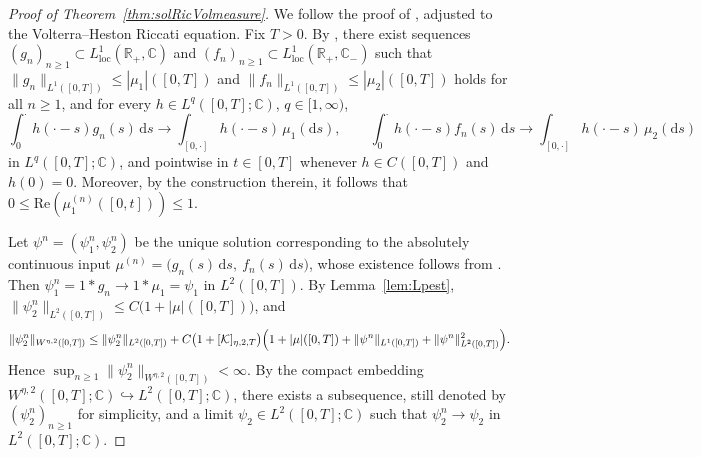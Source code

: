 \documentclass[10pt,a4paper,reqno]{amsart}
\theoremstyle{plain}
\theoremstyle{definition}
\theoremstyle{remark}
\theoremstyle{example}
\begin{document}
\begin{proof}[Proof of Theorem~\ref{thm:solRicVolmeasure}]
     We follow the proof of \cite[Thm. 3.10]{friesen2024volterra}, adjusted to the Volterra--Heston Riccati equation. Fix $T>0$. By \cite[Lem. 3.8]{friesen2024volterra}, there exist sequences $(g_n)_{n\ge1}\subset L^1_{\mathrm{loc}}(\mathbb{R}_+,\mathbb{C})$ and $(f_n)_{n\ge1}\subset L^1_{\mathrm{loc}}(\mathbb{R}_+,\mathbb{C}_-)$ such that $\|g_n\|_{L^1([0,T])}\le |\mu_1|([0,T])$ and $\|f_n\|_{L^1([0,T])}\le |\mu_2|([0,T])$ holds for all $n \geq 1$, and for every $h\in L^q([0,T];\mathbb{C})$, $q\in[1,\infty)$,
     $$
        \int_0^\cdot h(\cdot-s)g_n(s)\,\mathrm{d}s \longrightarrow \int_{[0,\cdot]} h(\cdot-s)\,\mu_1(\mathrm{d}s),
        \qquad
        \int_0^\cdot h(\cdot-s)f_n(s)\,\mathrm{d}s \longrightarrow \int_{[0,\cdot]} h(\cdot-s)\,\mu_2(\mathrm{d}s)
     $$
     in $L^q([0,T];\mathbb{C})$, and pointwise in $t\in[0,T]$ whenever $h\in C([0,T])$ and $h(0)=0$. Moreover, by the construction therein, it follows that $0 \leq \mathrm{Re}(\mu_1^{(n)}([0,t])) \leq 1$. 

     Let $\psi^n=(\psi_1^n,\psi_2^n)$ be the unique solution corresponding to the absolutely continuous input $\mu^{(n)} = \bigl(g_n(s)\,\mathrm{d}s,\ f_n(s)\,\mathrm{d}s\bigr)$, whose existence follows from \cite[Thm. 7.1(ii)]{abi2019affine}. Then $\psi_1^n = 1\ast g_n \longrightarrow 1\ast\mu_1 = \psi_1$ in $L^2([0,T])$. By Lemma~\ref{lem:Lpest}, $\|\psi_2^n\|_{L^2([0,T])}\le C\bigl(1+|\mu|([0,T])\bigr)$, and
     \begin{align*}
         \|\psi_2^n\|_{W^{\eta,2}([0,T])}
         \le \|\psi_2^n\|_{L^2([0,T])} + C\bigl(1+[\mathcal{K}]_{\eta,2,T}\bigr)
             \Bigl(1+|\mu|([0,T])+\|\psi^n\|_{L^1([0,T])}
             +\|\psi^n\|_{L^2([0,T])}^2\Bigr).
     \end{align*}
     Hence $\sup_{n\geq1}\|\psi_2^n\|_{W^{\eta,2}([0,T])}<\infty$. By the compact embedding
     $W^{\eta,2}([0,T];\mathbb{C})\hookrightarrow L^2([0,T];\mathbb{C})$, there exists a subsequence,
     still denoted by $(\psi_2^n)_{n\geq1}$ for simplicity, and a limit $\psi_2\in L^2([0,T];\mathbb{C})$ such that $\psi_2^n\to\psi_2$ in $L^2([0,T];\mathbb{C})$.


\end{proof}
\end{document}
